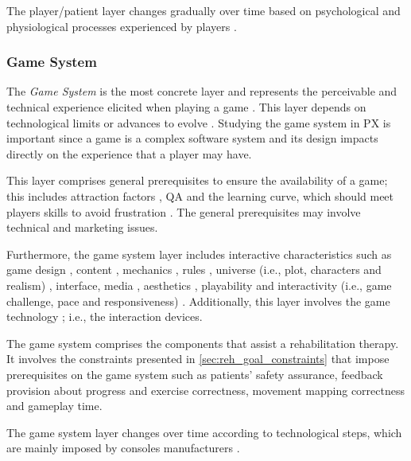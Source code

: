 The player/patient layer changes gradually over time based on psychological and physiological processes experienced by players \autocite{Nackea2}.

\subsubsection{Game System}
The \textit{Game System} is the most concrete layer and represents the perceivable and technical experience elicited when playing a game \autocite{Nackea2,Elson2014,Nackea,Nacked}. This layer depends on technological limits or advances to evolve \autocite{Fernandez2008}. Studying the game system in \ac{PX} is important since a game is a complex software system \autocite{Mayra,Nackea} and its design impacts directly on the experience that a player may have.

This layer comprises general prerequisites to ensure the availability of a game; this includes attraction factors \autocite{Elson2014}, \ac{QA} \autocite{Nacked} and the learning curve, which should meet players skills to avoid frustration \autocite{Nacked}. The general prerequisites may involve technical \autocite{Fernandez2008,Engl2013,Nackea2} and marketing \autocite{Nacked} issues.

Furthermore, the game system layer includes interactive characteristics such as game design \autocite{Nacked}, content \autocite{Elson2014,Nackea2,Fernandez2008}, mechanics \autocite{Elson2014,Ferrara}, rules \autocite{Nackea}, universe (i.e., plot, characters and realism) \autocite{Fernandez2008,Ferrara}, interface, media \autocite{DeKort2007b,Fernandez2008}, aesthetics \autocite{Ferrara}, playability \autocite{Engl2013,Fernandez2008} and interactivity (i.e., game challenge, pace and responsiveness) \autocite{Fernandez2008}. Additionally, this layer involves the game technology \autocite{Engl2013,Fernandez2008}; i.e., the interaction devices.

The game system comprises the components that assist a rehabilitation therapy. It involves the constraints presented in \autoref{sec:reh_goal_constraints} that impose prerequisites on the game system such as patients' safety assurance, feedback provision about progress and exercise correctness, movement mapping correctness and gameplay time.

The game system layer changes over time according to technological steps, which are mainly imposed by consoles manufacturers \autocite{Nackea,Nackea2}.

